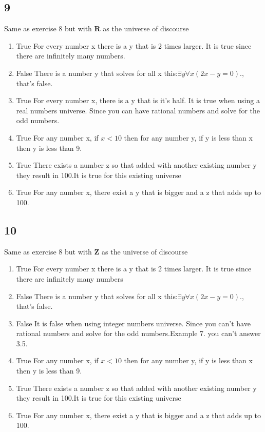 \documentclass{article}
\begin{document}
\subsection{9}
Same as exercise 8 but with $\mathbf{R}$ as the universe of discourse
\begin{enumerate}[label=(\alph*)]
    \item 
    True For every number x there is a y that is 2 times larger. It is true since there are infinitely many numbers.
    \item
    False There is a number y that solves for all x this:$\exists y \forall x(2x - y = 0).$, that's false.
    \item
    True For every number x, there is a y that is it's half. It is true when using a real numbers universe. Since you can have rational numbers and solve for the odd numbers.
    \item
    True For any number x, if $x<10$ then for any number y, if y is less than x then y is less than 9.
    \item
    True There exists a number z so that added with another existing number y they result in 100.It is true for this existing universe 
    \item
    True  For any number x, there exist a y that is bigger and a z that adds up to 100.
\end{enumerate}
\subsection{10}
Same as exercise 8 but with $\mathbf{Z}$ as the universe of discourse
\begin{enumerate}[label=(\alph*)]
 \item 
    True For every number x there is a y that is 2 times larger. It is true since there are infinitely many numbers
    \item
    False There is a number y that solves for all x this:$\exists y \forall x(2x - y = 0).$, that's false. 
    \item
    False It is false when using integer numbers universe. Since you can't have rational numbers and solve for the odd numbers.Example 7. you can't answer 3.5.
    \item
    True For any number x, if $x<10$ then for any number y, if y is less than x then y is less than 9.
    \item
    True There exists a number z so that added with another existing number y they result in 100.It is true for this existing universe
    \item
    True For any number x, there exist a y that is bigger and a z that adds up to 100.
\end{enumerate}
\end{document}
